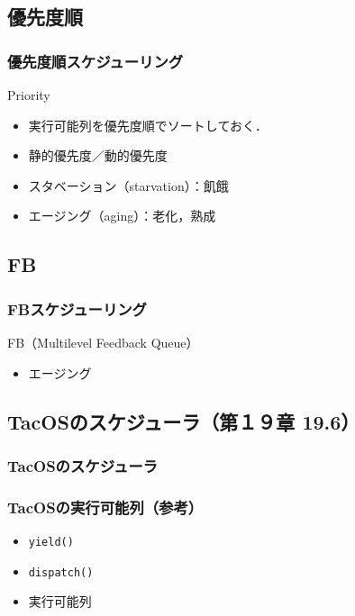 \documentclass[unicode]{beamer}                   %
\begin{document}
\subsection{優先度順}
\begin{frame}
  \frametitle{優先度順スケジューリング}
  Priority
  \vfill
  \begin{itemize}
  \item 実行可能列を優先度順でソートしておく．
  \end{itemize}
  \vfill
  \vfill
  \begin{itemize}
    \item 静的優先度／動的優先度
    \item スタベーション（starvation）：飢餓
    \item エージング（aging）：老化，熟成
  \end{itemize}
  \vfill
\end{frame}

\subsection{FB}
\begin{frame}
  \frametitle{FBスケジューリング}
  FB（Multilevel Feedback Queue）\\
  \vfill
  \vfill
  \begin{itemize}
    \item エージング
  \end{itemize}
  \vfill
\end{frame}

\subsection{TacOSのスケジューラ（第１９章 19.6）}
\begin{frame}[fragile]
  \frametitle{TacOSのスケジューラ}
  \vfill
\end{frame}

\begin{frame}
  \frametitle{TacOSの実行可能列（参考）}
  \begin{itemize}
  \item {\tt yield()}
  \item {\tt dispatch()}
    \vfill
  \item 実行可能列
  \end{itemize}
  \vfill
\end{frame}
\end{document}
